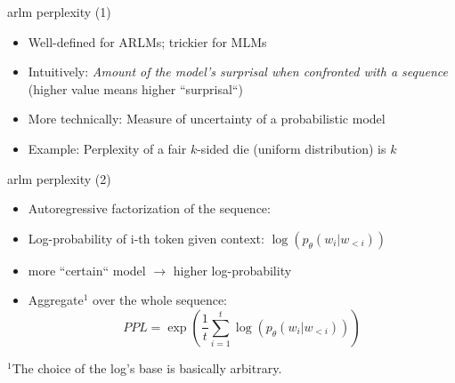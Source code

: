 \begin{frame}{arlm perplexity (1)}

\vfill

\begin{itemize}
	\item Well-defined for ARLMs; trickier for MLMs
	\item Intuitively: \textit{Amount of the model's surprisal when confronted with a sequence} (higher value means higher ``surprisal``)
	\item More technically: Measure of uncertainty of a probabilistic model
	\item Example: Perplexity of a fair $k$-sided die (uniform distribution) is $k$
\end{itemize}

\vfill

\end{frame}


\begin{frame}{arlm perplexity (2)}

\vfill
\begin{itemize}
	\item Autoregressive factorization of the sequence:
\end{itemize}

\begin{figure}
    \centering
\end{figure}

\begin{itemize}
	\item Log-probability of i-th token given context: $\log(p_\theta(w_i|w_{<i}))$
	\item[] more ``certain`` model $\to$ higher log-probability
	\item Aggregate$^1$ over the whole sequence:
				$$PPL = \exp\left(\frac{1}{t} \sum_{i=1}^t \log(p_\theta(w_i|w_{<i}))\right)$$
\end{itemize}

\vfill

\footnotesize{$^1$The choice of the log’s base is basically arbitrary.}

\end{frame}


